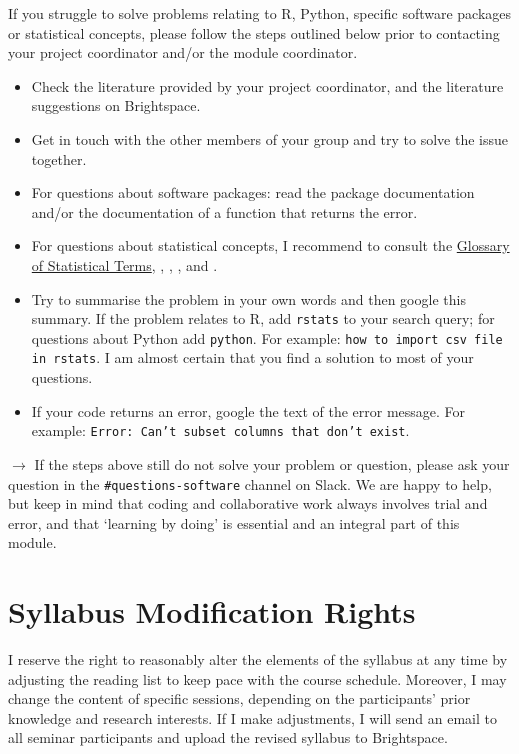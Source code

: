 \documentclass[abstract=on,parskip=full,headings=standardclasses,fontsize=11pt,paper=a4]{scrartcl}
\begin{document}
If you struggle to solve problems relating to \textsf{R}, Python, specific software packages or statistical concepts, please follow the steps outlined below prior to contacting your project coordinator and/or the module coordinator. %
\begin{itemize}
\item Check the literature provided by your project coordinator, and the literature suggestions on Brightspace.
\item Get in touch with the other members of your group and try to solve the issue together.
\item For questions about software packages: read the package documentation and/or the documentation of a  function that returns the error.
\item For questions about statistical concepts, I recommend to consult the \href{https://hbiostat.org/doc/glossary.pdf}{Glossary of Statistical Terms}, \textcite{vanatteveldt21}, \textcite{ismay20}, \textcite{wickham17}, and \textcite{healy19}.
\item Try to summarise the problem in your own words and then google this summary. If the problem relates to \textsf{R}, add \texttt{rstats} to your search query; for questions about Python add \texttt{python}. For example: \texttt{how to import csv file in rstats}. I am almost certain that you find a solution to most of your questions. 
\item If your code returns an error, google the text of the error message.  For example: \texttt{Error: Can't subset columns that don't exist}.
\end{itemize}

$\longrightarrow$ If the steps above still do not solve your problem or question, please ask your question in the \texttt{\#questions-software}  channel on Slack. We are happy to help, but keep in mind that coding and collaborative work always involves trial and error, and that `learning by doing' is essential and an integral part of this module.

\section*{Syllabus Modification Rights}

I reserve the right to reasonably alter the elements of the syllabus at any time by adjusting the reading list to keep pace with the course schedule. Moreover, I may change the content of specific sessions, depending on the participants' prior knowledge and research interests. If I make adjustments, I will send an email to all seminar participants and upload the revised syllabus to Brightspace.
\end{document}
